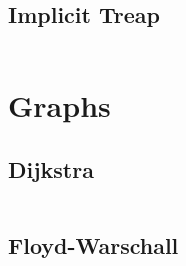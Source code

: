 \documentclass[8pt,a4paper,landscape,oneside]{amsart}
\begin{document}
	\newpage
	\begin{multicols*}{4}
		\subsection{Implicit Treap}
		\inputminted[firstline=16,lastline=69]{c++}{_code/datastructures/implicit_treap.cpp}
		\vfill\null
		\columnbreak
		\section{Graphs}
		\subsection{Dijkstra}
		\inputminted[firstline=21,lastline=32]{c++}{_code/graphs/dijkstra.cpp}
		\subsection{Floyd-Warschall}
		\inputminted[firstline=17,lastline=21]{c++}{_code/graphs/floyd_warschall.cpp}
		\vfill\null
	\end{multicols*}
\end{document}
